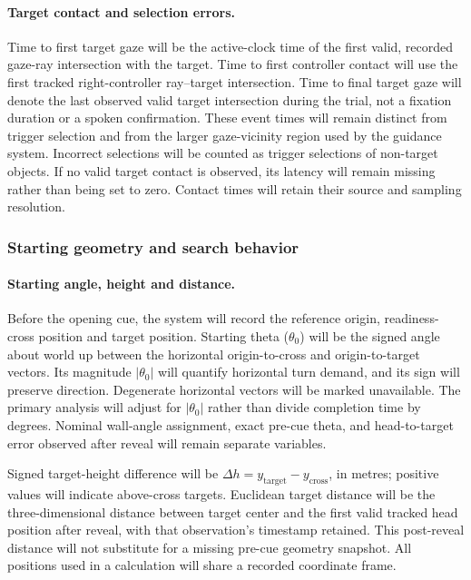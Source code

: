 \documentclass[11pt,letterpaper]{article}
\begin{document}
\paragraph{Target contact and selection errors.} Time to first target gaze will be the active-clock time of the first valid, recorded gaze-ray intersection with the target. Time to first controller contact will use the first tracked right-controller ray--target intersection. Time to final target gaze will denote the last observed valid target intersection during the trial, not a fixation duration or a spoken confirmation. These event times will remain distinct from trigger selection and from the larger gaze-vicinity region used by the guidance system. Incorrect selections will be counted as trigger selections of non-target objects. If no valid target contact is observed, its latency will remain missing rather than being set to zero. Contact times will retain their source and sampling resolution.

\subsubsection{Starting geometry and search behavior}
\paragraph{Starting angle, height and distance.} Before the opening cue, the system will record the reference origin, readiness-cross position and target position. Starting theta ($\theta_0$) will be the signed angle about world up between the horizontal origin-to-cross and origin-to-target vectors. Its magnitude $|\theta_0|$ will quantify horizontal turn demand, and its sign will preserve direction. Degenerate horizontal vectors will be marked unavailable. The primary analysis will adjust for $|\theta_0|$ rather than divide completion time by degrees. Nominal wall-angle assignment, exact pre-cue theta, and head-to-target error observed after reveal will remain separate variables.

Signed target-height difference will be $\Delta h=y_{\mathrm{target}}-y_{\mathrm{cross}}$, in metres; positive values will indicate above-cross targets. Euclidean target distance will be the three-dimensional distance between target center and the first valid tracked head position after reveal, with that observation's timestamp retained. This post-reveal distance will not substitute for a missing pre-cue geometry snapshot. All positions used in a calculation will share a recorded coordinate frame.
\end{document}
